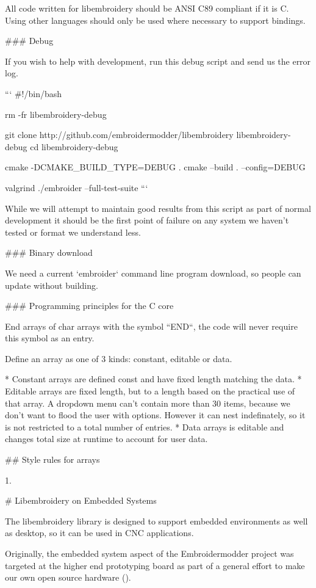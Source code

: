 All code written for libembroidery should be ANSI C89 compliant
if it is C. Using other languages should only be used where
necessary to support bindings.

### Debug

If you wish to help with development, run this debug script and send us the
error log.

```
#!/bin/bash

rm -fr libembroidery-debug

git clone http://github.com/embroidermodder/libembroidery libembroidery-debug
cd libembroidery-debug

cmake -DCMAKE_BUILD_TYPE=DEBUG .
cmake --build . --config=DEBUG

valgrind ./embroider --full-test-suite
```

While we will attempt to maintain good results from this script as part of
normal development it should be the first point of failure on any system we
haven't tested or format we understand less.

### Binary download

We need a current `embroider` command line program download, so people can update
without building.

### Programming principles for the C core

End arrays of char arrays with the symbol ``END``, the code will never require
this symbol as an entry.

Define an array as one of 3 kinds: constant, editable or data.

* Constant arrays are defined const and have fixed length matching the data.
* Editable arrays are fixed length, but to a length based on the practical use of that array. A dropdown menu can't contain more than 30 items, because we don't want to flood the user with options. However it can nest indefinately, so it is not restricted to a total number of entries.
* Data arrays is editable and changes total size at runtime to account for user data.

## Style rules for arrays

1.

# Libembroidery on Embedded Systems

The libembroidery library is designed to support embedded environments as well
as desktop, so it can be used in CNC applications.

Originally, the embedded system aspect of the Embroidermodder project was
targeted at the higher end  prototyping board as part
of a general effort to make our own open source hardware ().

